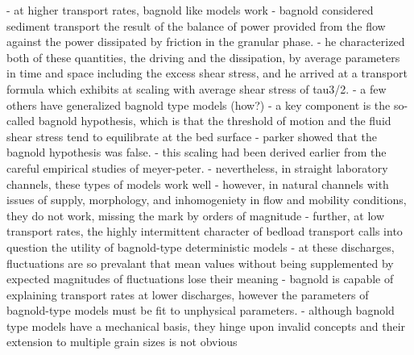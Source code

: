 \documentclass{article}
\begin{document}
{- at higher transport rates, bagnold like models work 
- bagnold considered sediment transport the result of the balance of power provided from the flow against the power dissipated by friction in the granular phase. 
- he characterized both of these quantities, the driving and the dissipation, by average parameters in time and space including the excess shear stress, and he arrived at a transport formula which exhibits at scaling with average shear stress of tau3/2.
- a few others have generalized bagnold type models (how?) 
- a key component is the so-called bagnold hypothesis, which is that the threshold of motion and the fluid shear stress tend to equilibrate at the bed surface
- parker showed that the bagnold hypothesis was false.
- this scaling had been derived earlier from the careful empirical studies of meyer-peter. 
- nevertheless, in straight laboratory channels, these types of models work well 
- however, in natural channels with issues of supply, morphology, and inhomogeniety in flow and mobility conditions, they do not work, missing the mark by orders of magnitude
- further, at low transport rates, the highly intermittent character of bedload transport calls into question the utility of bagnold-type deterministic models 
- at these discharges, fluctuations are so prevalant that mean values without being supplemented by expected magnitudes of fluctuations lose their meaning
- bagnold is capable of explaining transport rates at lower discharges, however the parameters of bagnold-type models must be fit to unphysical parameters. 
- although bagnold type models have a mechanical basis, they hinge upon invalid concepts and their extension to multiple grain sizes is not obvious

}
\end{document}

